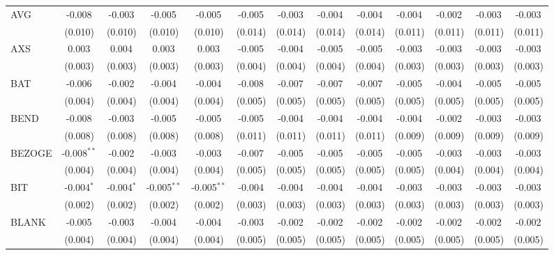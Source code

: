 \begin{table}[!htbp]
\begin{tabular}{@{\extracolsep{5pt}}lcccccccccccc}
 AVG & -0.008$^{}$ & -0.003$^{}$ & -0.005$^{}$ & -0.005$^{}$ & -0.005$^{}$ & -0.003$^{}$ & -0.004$^{}$ & -0.004$^{}$ & -0.004$^{}$ & -0.002$^{}$ & -0.003$^{}$ & -0.003$^{}$ \\
  & (0.010) & (0.010) & (0.010) & (0.010) & (0.014) & (0.014) & (0.014) & (0.014) & (0.011) & (0.011) & (0.011) & (0.011) \\
 AXS & 0.003$^{}$ & 0.004$^{}$ & 0.003$^{}$ & 0.003$^{}$ & -0.005$^{}$ & -0.004$^{}$ & -0.005$^{}$ & -0.005$^{}$ & -0.003$^{}$ & -0.003$^{}$ & -0.003$^{}$ & -0.003$^{}$ \\
  & (0.003) & (0.003) & (0.003) & (0.003) & (0.004) & (0.004) & (0.004) & (0.004) & (0.003) & (0.003) & (0.003) & (0.003) \\
 BAT & -0.006$^{}$ & -0.002$^{}$ & -0.004$^{}$ & -0.004$^{}$ & -0.008$^{}$ & -0.007$^{}$ & -0.007$^{}$ & -0.007$^{}$ & -0.005$^{}$ & -0.004$^{}$ & -0.005$^{}$ & -0.005$^{}$ \\
  & (0.004) & (0.004) & (0.004) & (0.004) & (0.005) & (0.005) & (0.005) & (0.005) & (0.005) & (0.005) & (0.005) & (0.005) \\
 BEND & -0.008$^{}$ & -0.003$^{}$ & -0.005$^{}$ & -0.005$^{}$ & -0.005$^{}$ & -0.004$^{}$ & -0.004$^{}$ & -0.004$^{}$ & -0.004$^{}$ & -0.002$^{}$ & -0.003$^{}$ & -0.003$^{}$ \\
  & (0.008) & (0.008) & (0.008) & (0.008) & (0.011) & (0.011) & (0.011) & (0.011) & (0.009) & (0.009) & (0.009) & (0.009) \\
 BEZOGE & -0.008$^{**}$ & -0.002$^{}$ & -0.003$^{}$ & -0.003$^{}$ & -0.007$^{}$ & -0.005$^{}$ & -0.005$^{}$ & -0.005$^{}$ & -0.005$^{}$ & -0.003$^{}$ & -0.003$^{}$ & -0.003$^{}$ \\
  & (0.004) & (0.004) & (0.004) & (0.004) & (0.005) & (0.005) & (0.005) & (0.005) & (0.005) & (0.004) & (0.004) & (0.004) \\
 BIT & -0.004$^{*}$ & -0.004$^{*}$ & -0.005$^{**}$ & -0.005$^{**}$ & -0.004$^{}$ & -0.004$^{}$ & -0.004$^{}$ & -0.004$^{}$ & -0.003$^{}$ & -0.003$^{}$ & -0.003$^{}$ & -0.003$^{}$ \\
  & (0.002) & (0.002) & (0.002) & (0.002) & (0.003) & (0.003) & (0.003) & (0.003) & (0.003) & (0.003) & (0.003) & (0.003) \\
 BLANK & -0.005$^{}$ & -0.003$^{}$ & -0.004$^{}$ & -0.004$^{}$ & -0.003$^{}$ & -0.002$^{}$ & -0.002$^{}$ & -0.002$^{}$ & -0.002$^{}$ & -0.002$^{}$ & -0.002$^{}$ & -0.002$^{}$ \\
  & (0.004) & (0.004) & (0.004) & (0.004) & (0.005) & (0.005) & (0.005) & (0.005) & (0.005) & (0.005) & (0.005) & (0.005) \\

\end{tabular}
\end{table}
